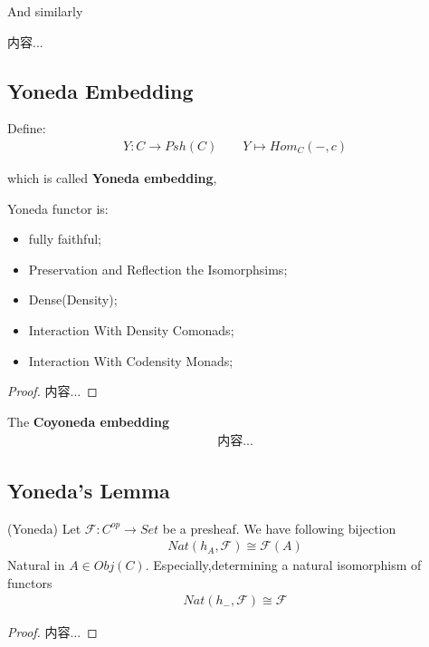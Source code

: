 \documentclass[Total.tex]{subfiles}
\begin{document}
				And similarly
				\begin{Def}
					内容...
				\end{Def}
			\subsection{Yoneda Embedding}
			\begin{Def}
				Define:
				\begin{gather*}
					Y:C\rightarrow Psh(C)\qquad Y\mapsto Hom_C(-,c)
				\end{gather*}
				
				which is called \textbf{Yoneda embedding},
			\end{Def}
			
			\begin{proposition}
				Yoneda functor is:
				\begin{itemize}
					\item fully faithful;
					\item Preservation and Reflection the Isomorphsims;
					\item Dense(Density);
					\item Interaction With Density Comonads;
					\item Interaction With Codensity Monads;
				\end{itemize}
			\end{proposition}
			\begin{proof}
				内容...
			\end{proof}
			\begin{Def}
				The \textbf{Coyoneda embedding}
				\begin{gather*}
					内容...
				\end{gather*}
			\end{Def}
			\subsection{Yoneda's Lemma}
			
			\begin{theorem}
				(Yoneda) Let $\mathcal{F}:C^{op}\rightarrow Set$ be a presheaf. We have following bijection
				\begin{gather*}
					Nat(h_A,\mathcal{F})\cong\mathcal{F}(A)
				\end{gather*}
				Natural in $A\in Obj(C)$. Especially,determining a natural isomorphism of functors
				\begin{gather*}
					Nat(h_{-},\mathcal{F})\cong \mathcal{F}
				\end{gather*}
			\end{theorem}
			\begin{proof}
				内容...
			\end{proof}
			
\end{document}
